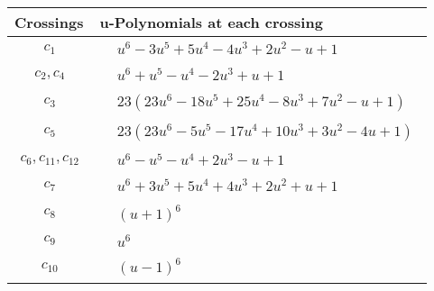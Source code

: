 \documentclass[1p]{elsarticle_modified}
\theoremstyle{definition}
\begin{document}
\begin{tabular}{m{50pt}|m{274pt}}
Crossings & \hspace{64pt}u-Polynomials at each crossing \\
\hline $$\begin{aligned}c_{1}\end{aligned}$$&$\begin{aligned}
&u^6-3 u^5+5 u^4-4 u^3+2 u^2- u+1
\end{aligned}$\\
\hline $$\begin{aligned}c_{2},c_{4}\end{aligned}$$&$\begin{aligned}
&u^6+u^5- u^4-2 u^3+u+1
\end{aligned}$\\
\hline $$\begin{aligned}c_{3}\end{aligned}$$&$\begin{aligned}
&23(23 u^6-18 u^5+25 u^4-8 u^3+7 u^2- u+1)
\end{aligned}$\\
\hline $$\begin{aligned}c_{5}\end{aligned}$$&$\begin{aligned}
&23(23 u^6-5 u^5-17 u^4+10 u^3+3 u^2-4 u+1)
\end{aligned}$\\
\hline $$\begin{aligned}c_{6},c_{11},c_{12}\end{aligned}$$&$\begin{aligned}
&u^6- u^5- u^4+2 u^3- u+1
\end{aligned}$\\
\hline $$\begin{aligned}c_{7}\end{aligned}$$&$\begin{aligned}
&u^6+3 u^5+5 u^4+4 u^3+2 u^2+u+1
\end{aligned}$\\
\hline $$\begin{aligned}c_{8}\end{aligned}$$&$\begin{aligned}
&(u+1)^6
\end{aligned}$\\
\hline $$\begin{aligned}c_{9}\end{aligned}$$&$\begin{aligned}
&u^6
\end{aligned}$\\
\hline $$\begin{aligned}c_{10}\end{aligned}$$&$\begin{aligned}
&(u-1)^6
\end{aligned}$\\
\hline
\end{tabular}\\~\\
\end{document}
